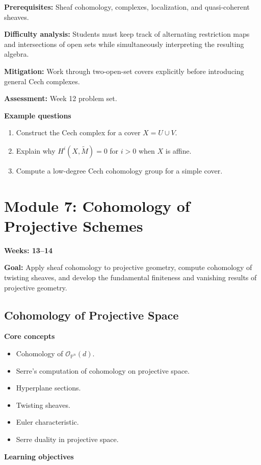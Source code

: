 \documentclass[11pt]{article}
\begin{document}
\textbf{Prerequisites:} Sheaf cohomology, complexes, localization, and quasi-coherent sheaves.

\textbf{Difficulty analysis:} Students must keep track of alternating restriction maps and intersections of open sets while simultaneously interpreting the resulting algebra.

\textbf{Mitigation:} Work through two-open-set covers explicitly before introducing general Cech complexes.

\textbf{Assessment:} Week 12 problem set.

\textbf{Example questions}
\begin{enumerate}
    \item Construct the Cech complex for a cover $X=U\cup V$.
    \item Explain why $H^i(X,\widetilde{M})=0$ for $i>0$ when $X$ is affine.
    \item Compute a low-degree Cech cohomology group for a simple cover.
\end{enumerate}

\section{Module 7: Cohomology of Projective Schemes}

\textbf{Weeks: 13--14}

\textbf{Goal:} Apply sheaf cohomology to projective geometry, compute cohomology of twisting sheaves, and develop the fundamental finiteness and vanishing results of projective geometry.

\subsection{Cohomology of Projective Space}

\textbf{Core concepts}
\begin{itemize}
    \item Cohomology of $\mathcal{O}_{\mathbb{P}^n}(d)$.
    \item Serre's computation of cohomology on projective space.
    \item Hyperplane sections.
    \item Twisting sheaves.
    \item Euler characteristic.
    \item Serre duality in projective space.
\end{itemize}

\textbf{Learning objectives}
\end{document}
